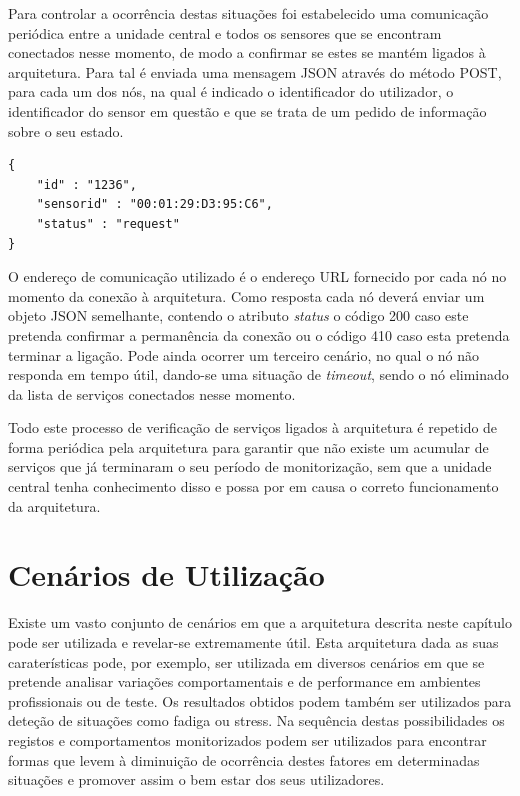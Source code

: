 Para controlar a ocorrência destas situações foi estabelecido uma comunicação periódica entre a unidade central e todos os sensores que se encontram conectados nesse momento, de modo a confirmar se estes se mantém ligados à arquitetura. Para tal é enviada uma mensagem JSON através do método POST, para cada um dos nós, na qual é indicado o identificador do utilizador, o identificador do sensor em questão e que se trata de um pedido de informação sobre o seu estado.\\

\begin{lstlisting}[caption=Mensagem de verificação de estado de um nó]
{
	"id" : "1236",
  	"sensorid" : "00:01:29:D3:95:C6",
	"status" : "request"
}

\end{lstlisting}

O endereço de comunicação utilizado é o endereço URL fornecido por cada nó no momento da conexão à arquitetura. Como resposta cada nó deverá enviar um objeto JSON semelhante, contendo o atributo \textit{status} o código 200 caso este pretenda confirmar a permanência da conexão ou o código 410 caso esta pretenda terminar a ligação. Pode ainda ocorrer um terceiro cenário, no qual o nó não responda em tempo útil, dando-se uma situação de \textit{timeout}, sendo o nó eliminado da lista de serviços conectados nesse momento.

Todo este processo de verificação de serviços ligados à arquitetura é repetido de forma periódica pela arquitetura para garantir que não existe um acumular de serviços que já terminaram o seu período de monitorização, sem que a unidade central tenha conhecimento disso e possa por em causa o correto funcionamento da arquitetura.

\section{Cenários de Utilização}

Existe um vasto conjunto de cenários em que a arquitetura descrita neste capítulo pode ser utilizada e revelar-se extremamente útil. Esta arquitetura dada as suas caraterísticas pode, por exemplo, ser utilizada em diversos cenários em que se pretende analisar variações comportamentais e de performance em ambientes profissionais ou de teste. Os resultados obtidos podem também ser utilizados para deteção de situações como fadiga ou stress. Na sequência destas possibilidades os registos e comportamentos monitorizados podem ser utilizados para encontrar formas que levem à diminuição de ocorrência destes fatores em determinadas situações e promover assim o bem estar dos seus utilizadores.

